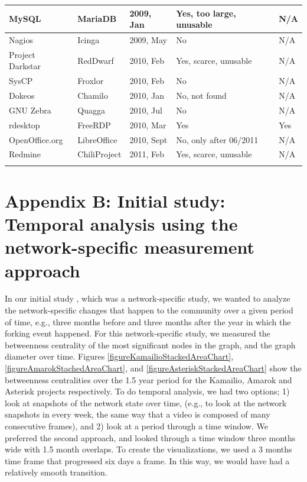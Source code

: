 \documentclass[12pt]{report}
\begin{document}
\begin{appendices}
\begin{table} [H]
\begin{tabular}{m{} m{} m{} m{} m{}}
MySQL & MariaDB & 2009, Jan & Yes, too large, unusable & N/A\\ \hline
Nagios & Icinga & 2009, May & No & N/A \\ \hline
Project Darkstar& RedDwarf & 2010, Feb & Yes, scarce, unusable & N/A \\ \hline
SysCP & Froxlor & 2010, Feb & No & N/A \\ \hline
Dokeos & Chamilo & 2010, Jan & No, not found & N/A \\ \hline
GNU Zebra & Quagga & 2010, Jul & No & N/A \\ \hline
rdesktop & FreeRDP & 2010, Mar & Yes & Yes \\ \hline
OpenOffice.org & LibreOffice & 2010, Sept & No, only after 06/2011 & N/A \\ \hline
Redmine & ChiliProject & 2011, Feb & Yes, scarce, unusable & N/A \\
\noalign{\smallskip}\hline
\end{tabular}
\end{table}

\pagebreak


\section{Appendix B: Initial study: Temporal analysis using the network-specific measurement approach}
\label{sectionInitialStudy}
In our initial study \cite{AzarbakhtOpenSym2013}\cite{AzarbakhtOSS2013}\cite{AzarbakhtVLHCC2014}, which was a network-specific study, we wanted to analyze the network-specific changes that happen to the community over a given period of time, e.g., three months before and three months after the year in which the forking event happened. For this network-specific study, we measured the betweenness centrality \cite{Brandes} of the most significant nodes in the graph, and the graph diameter over time. Figures \ref{figureKamailioStackedAreaChart}, \ref{figureAmarokStachedAreaChart}, and \ref{figureAsteriskStackedAreaChart} show the betweenness centralities over the 1.5 year period for the Kamailio, Amarok and Asterisk projects respectively. To do temporal analysis, we had two options; 1) look at snapshots of the network state over time, (e.g., to look at the network snapshots in every week, the same way that a video is composed of many consecutive frames), and 2) look at a period through a time window. We preferred the second approach, and looked through a time window three months wide with 1.5 month overlaps. To create the visualizations, we used a 3 months time frame that progressed six days a frame. In this way, we would have had a relatively smooth transition.


\end{appendices}
\end{document}
